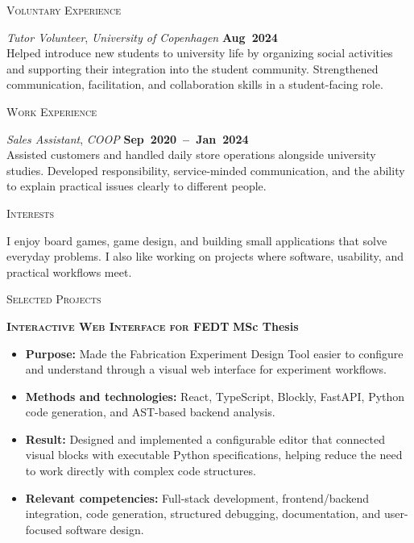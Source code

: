 \documentclass[11pt, a4paper]{article}
\newcommand{\dates}[1]{\hfill\mbox{\textbf{#1}}}
\newcommand{\headright}[1]{\vspace*{2.5ex}\textsc{\Large\color{gray}#1}\par%
\vspace*{-2ex}{\color{gray}\hrulefill}\par}
\newcommand{\projectheading}[2]{%
    \noindent\textbf{\textsc{#1}} \hfill \textbf{#2}\par
    \vspace{-0.3em}
}
\begin{document}
\begin{minipage}[t]{0.56\textwidth}
\headright{Voluntary Experience}

\textit{Tutor Volunteer}, \textit{University of Copenhagen} \dates{Aug 2024} \\[0.2em]
\small Helped introduce new students to university life by organizing social activities and supporting their integration into the student community. Strengthened communication, facilitation, and collaboration skills in a student-facing role.

\headright{Work Experience}

\textit{Sales Assistant}, \textit{COOP} \dates{Sep 2020 -- Jan 2024} \\[0.2em]
\small Assisted customers and handled daily store operations alongside university studies. Developed responsibility, service-minded communication, and the ability to explain practical issues clearly to different people.

\headright{Interests}
I enjoy board games, game design, and building small applications that solve everyday problems. I also like working on projects where software, usability, and practical workflows meet.

\end{minipage}

\newpage
{}
\setlength{\parindent}{0pt}
\setlength{\parskip}{0pt}
\pagestyle{empty}

\headright{Selected Projects}

\projectheading{Interactive Web Interface for FEDT}{MSc Thesis}
\begin{itemize}
\item \textbf{Purpose:} Made the Fabrication Experiment Design Tool easier to configure and understand through a visual web interface for experiment workflows.
\item \textbf{Methods and technologies:} React, TypeScript, Blockly, FastAPI, Python code generation, and AST-based backend analysis.
\item \textbf{Result:} Designed and implemented a configurable editor that connected visual blocks with executable Python specifications, helping reduce the need to work directly with complex code structures.
\item \textbf{Relevant competencies:} Full-stack development, frontend/backend integration, code generation, structured debugging, documentation, and user-focused software design.
\end{itemize}
\end{document}
